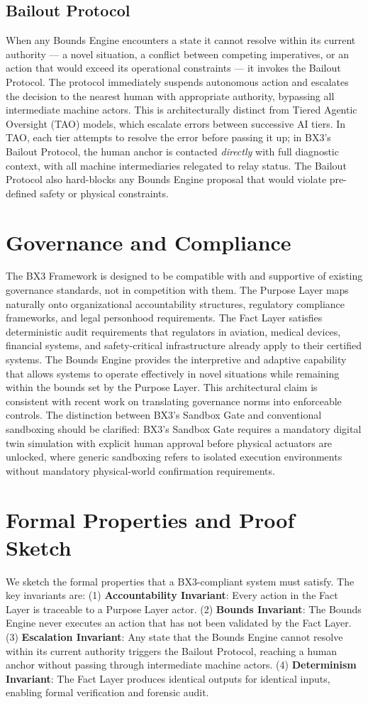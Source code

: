 \documentclass[11pt, a4paper]{article}
\begin{document}
\subsection{Bailout Protocol}
When any Bounds Engine encounters a state it cannot resolve within its current authority --- a novel situation, a conflict between competing imperatives, or an action that would exceed its operational constraints --- it invokes the Bailout Protocol. The protocol immediately suspends autonomous action and escalates the decision to the nearest human with appropriate authority, bypassing all intermediate machine actors. This is architecturally distinct from Tiered Agentic Oversight (TAO) models, which escalate errors between successive AI tiers. In TAO, each tier attempts to resolve the error before passing it up; in BX3's Bailout Protocol, the human anchor is contacted \textit{directly} with full diagnostic context, with all machine intermediaries relegated to relay status. The Bailout Protocol also hard-blocks any Bounds Engine proposal that would violate pre-defined safety or physical constraints.
\section{Governance and Compliance}
The BX3 Framework is designed to be compatible with and supportive of existing governance standards, not in competition with them. The Purpose Layer maps naturally onto organizational accountability structures, regulatory compliance frameworks, and legal personhood requirements. The Fact Layer satisfies deterministic audit requirements that regulators in aviation, medical devices, financial systems, and safety-critical infrastructure already apply to their certified systems. The Bounds Engine provides the interpretive and adaptive capability that allows systems to operate effectively in novel situations while remaining within the bounds set by the Purpose Layer. This architectural claim is consistent with recent work on translating governance norms into enforceable controls. The distinction between BX3's Sandbox Gate and conventional sandboxing should be clarified: BX3's Sandbox Gate requires a mandatory digital twin simulation with explicit human approval before physical actuators are unlocked, where generic sandboxing refers to isolated execution environments without mandatory physical-world confirmation requirements.
\section{Formal Properties and Proof Sketch}
We sketch the formal properties that a BX3-compliant system must satisfy. The key invariants are: (1) \textbf{Accountability Invariant}: Every action in the Fact Layer is traceable to a Purpose Layer actor. (2) \textbf{Bounds Invariant}: The Bounds Engine never executes an action that has not been validated by the Fact Layer. (3) \textbf{Escalation Invariant}: Any state that the Bounds Engine cannot resolve within its current authority triggers the Bailout Protocol, reaching a human anchor without passing through intermediate machine actors. (4) \textbf{Determinism Invariant}: The Fact Layer produces identical outputs for identical inputs, enabling formal verification and forensic audit.
\end{document}
